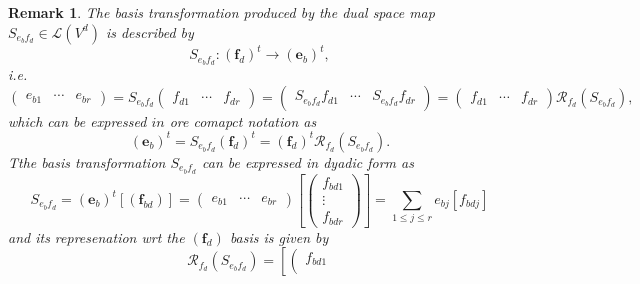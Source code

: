 \documentclass[aps,preprint]{revtex4}
\newtheorem{remark}[theorem]{Remark}
\begin{document}
\begin{remark}
The basis transformation produced by the dual space map $S_{e_{b}f_{d}}\in 
\mathcal{L}\left( V^{d}\right) $ is described by 
\begin{equation}
S_{e_{b}f_{d}}:\left( \boldsymbol{f}_{d}\right) ^{t}\rightarrow \left( 
\boldsymbol{e}_{b}\right) ^{t},
\end{equation}%
i.e. 
\begin{equation}
\left( 
\begin{array}{ccc}
e_{b1} & \cdots & e_{br}%
\end{array}%
\right) =S_{e_{b}f_{d}}\left( 
\begin{array}{ccc}
f_{d1} & \cdots & f_{dr}%
\end{array}%
\right) =\left( 
\begin{array}{ccc}
S_{e_{b}f_{d}}f_{d1} & \cdots & S_{e_{b}f_{d}}f_{dr}%
\end{array}%
\right) =\left( 
\begin{array}{ccc}
f_{d1} & \cdots & f_{dr}%
\end{array}%
\right) \mathcal{R}_{f_{d}}\left( S_{e_{b}f_{d}}\right) ,
\end{equation}%
which can be expressed $in$ ore comapct notation as 
\begin{equation}
\left( \boldsymbol{e}_{b}\right) ^{t}=S_{e_{b}f_{d}}\left( \boldsymbol{f}%
_{d}\right) ^{t}=\left( \boldsymbol{f}_{d}\right) ^{t}\mathcal{R}%
_{f_{d}}\left( S_{e_{b}f_{d}}\right) .
\end{equation}%
Tthe basis transformation $S_{e_{b}f_{d}}$ can be expressed in dyadic form
as 
\begin{equation}
S_{e_{b}f_{d}}=\left( \boldsymbol{e}_{b}\right) ^{t}\left[ \left( 
\boldsymbol{f}_{bd}\right) \right] =\left( 
\begin{array}{ccc}
e_{b1} & \cdots & e_{br}%
\end{array}%
\right) \left[ \left( 
\begin{array}{c}
f_{bd1} \\ 
\vdots \\ 
f_{bdr}%
\end{array}%
\right) \right] =\sum_{1\leq j\leq r}e_{bj}\left[ f_{bdj}\right]
\end{equation}%
and its represenation wrt the $\left( \boldsymbol{f}_{d}\right) $ basis is
given by 
\begin{equation}
\mathcal{R}_{f_{d}}\left( S_{e_{b}f_{d}}\right) =\left[ \left( 
\begin{array}{c}
f_{bd1} \\ 

\end{array}
\end{equation}
\end{remark}
\end{document}
